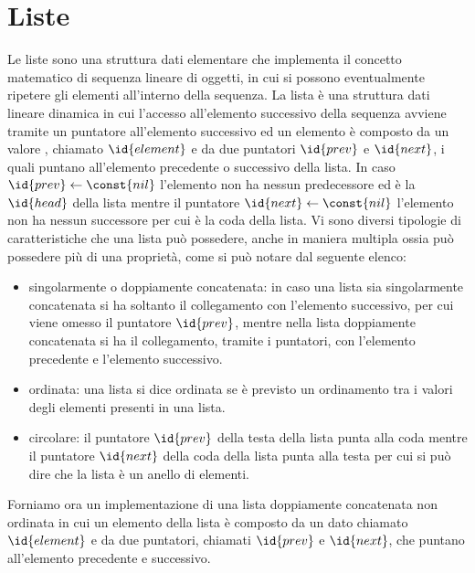 \section{Liste}
Le liste sono una struttura dati elementare che implementa il concetto matematico
di sequenza lineare di oggetti, in cui si possono eventualmente ripetere gli elementi
all'interno della sequenza.\newline
La lista è una struttura dati lineare dinamica in cui l'accesso all'elemento successivo
della sequenza avviene tramite un puntatore all'elemento successivo ed un elemento
è composto da un valore , chiamato $\id{element}$ e da due puntatori $\id{prev}$ e $\id{next}$,
i quali puntano all'elemento precedente o successivo della lista.\newline
In caso $\id{prev} \gets \const{nil}$ l'elemento non ha nessun predecessore ed è la $\id{head}$
della lista mentre il puntatore $\id{next} \gets \const{nil}$ l'elemento non ha
nessun successore per cui è la coda della lista.
Vi sono diversi tipologie di caratteristiche che una lista può possedere, anche in
maniera multipla ossia può possedere più di una proprietà, come si può notare dal seguente elenco:
\begin{itemize}
  \item singolarmente o doppiamente concatenata: in caso una lista sia singolarmente
        concatenata si ha soltanto il collegamento con l'elemento successivo, per
        cui viene omesso il puntatore $\id{prev}$, mentre nella lista doppiamente concatenata
         si ha il collegamento, tramite i puntatori, con l'elemento precedente e l'elemento successivo.
  \item ordinata: una lista si dice ordinata se è previsto un ordinamento tra i valori
        degli elementi presenti in una lista.
  \item circolare: il puntatore $\id{prev}$ della testa della lista punta alla coda
        mentre il puntatore $\id{next}$ della coda della lista punta alla testa
       per cui si può dire che la lista è un anello di elementi.
\end{itemize}

Forniamo ora un implementazione di una lista doppiamente concatenata non ordinata
in cui un elemento della lista è composto da un dato chiamato $\id{element}$ e da due
puntatori, chiamati $\id{prev}$ e $\id{next}$, che puntano all'elemento precedente e successivo.

